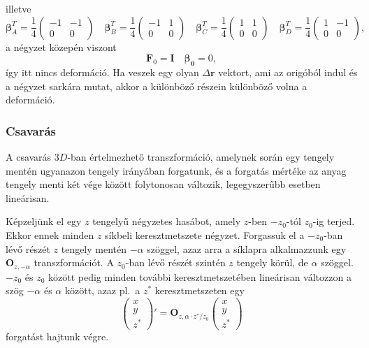 \documentclass[12pt,a4paper]{scrartcl}
\let\mathbf\bm
\begin{document}
illetve
\[{\mathbf{\beta }}_A^T = \frac{1}{4}\left( {\begin{array}{*{20}{c}}
  { - 1}&{ - 1} \\ 
  0&0 
\end{array}} \right)\quad {\mathbf{\beta }}_B^T = \frac{1}{4}\left( {\begin{array}{*{20}{c}}
  { - 1}&1 \\ 
  0&0 
\end{array}} \right)\quad {\mathbf{\beta }}_C^T = \frac{1}{4}\left( {\begin{array}{*{20}{c}}
  1&1 \\ 
  0&0 
\end{array}} \right)\quad {\mathbf{\beta }}_D^T = \frac{1}{4}\left( {\begin{array}{*{20}{c}}
  1&{ - 1} \\ 
  0&0 
\end{array}} \right),\]
a négyzet közepén viszont \[{{\mathbf{F}}_0} = {\mathbf{I}}\quad {\mathbf{\beta_0 }} = 0,\]
így itt nincs deformáció. Ha veszek egy olyan $\Delta {\mathbf{r}}$ vektort, ami az origóból indul és a négyzet sarkára mutat, akkor a különböző részein különböző volna a deformáció.


\subsubsection{Csavarás}
A csavarás $3D$-ban értelmezhető transzformáció, amelynek során egy tengely mentén ugyanazon tengely irányában forgatunk, és a forgatás mértéke az anyag tengely menti két vége között folytonosan változik, legegyszerűbb esetben lineárisan.

Képzeljünk el egy $z$ tengelyű négyzetes hasábot, amely $z$-ben $-z_0$-tól $z_0$-ig terjed. Ekkor ennek minden $z$ síkbeli keresztmetszete négyzet. Forgassuk el a $-z_0$-ban lévő részét $z$ tengely mentén $-\alpha$ szöggel, azaz arra a síklapra alkalmazzunk egy ${{\mathbf{O}}_{z, - \alpha }}$ transzformációt. A $z_0$-ban lévő részét szintén $z$ tengely körül, de $\alpha$ szöggel. $-z_0$ és $z_0$ között pedig minden további keresztmetszetében lineárisan változzon a szög $-\alpha$ és $\alpha$ között, azaz pl.\ a $z^*$ keresztmetszeten egy 
\begin{equation}
\left( {\begin{array}{*{20}{c}}
  x \\ 
  y \\ 
  {{z^ * }} 
\end{array}} \right)' = {{\mathbf{O}}_{z,\alpha  \cdot {z^ * }/z_0}} \left( {\begin{array}{*{20}{c}}
  x \\ 
  y \\ 
  {{z^ * }} 
\end{array}} \right)
\end{equation}
forgatást hajtunk végre.
\end{document}
